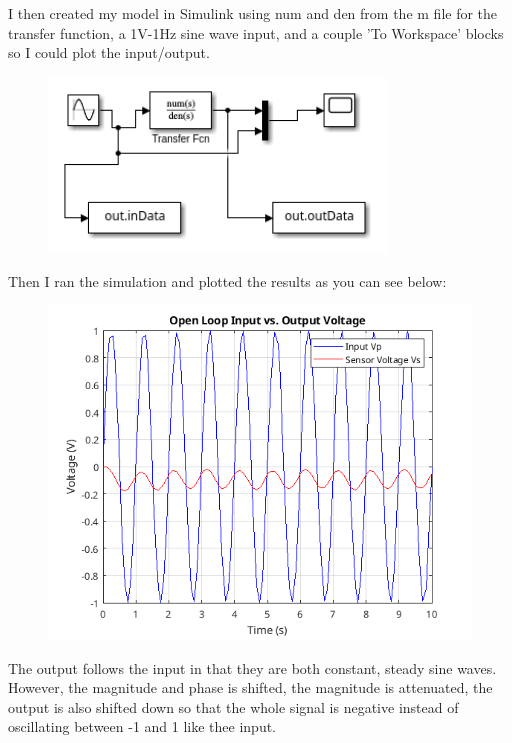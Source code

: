 \documentclass{article}
\begin{document}
I then created my model in Simulink using num and den from the m file for the transfer function, a 1V-1Hz sine wave input, and a couple 'To Workspace' blocks so I could plot the input/output.

\begin{figure}[H]
    \centering
    \includegraphics[width=0.8\textwidth]{simulinkOpenModel.png}
\end{figure}

Then I ran the simulation and plotted the results as you can see below:

\begin{figure}[H]
    \centering
    \includegraphics[width=\textwidth]{openPlot.png}
\end{figure}

The output follows the input in that they are both constant, steady sine waves.
However, the magnitude and phase is shifted, the magnitude is attenuated, the output is also shifted down so that the whole signal is negative instead of oscillating between -1 and 1 like thee input.
\end{document}

